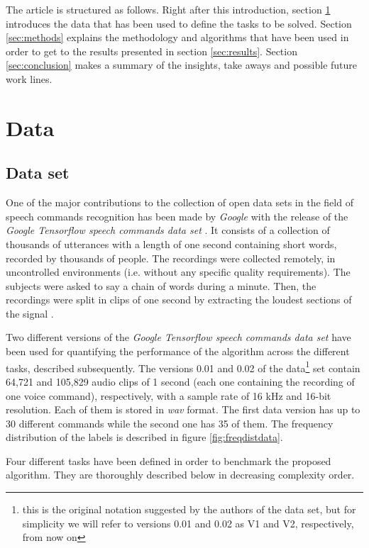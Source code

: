 \documentclass[review]{elsarticle}
\begin{document}
 The article is structured as follows. Right after this introduction, section \ref{sec:data} introduces the data that has been used to define the tasks to be solved. Section \ref{sec:methods} explains the methodology and algorithms that have been used in order to get to the results presented in section \ref{sec:results}. Section \ref{sec:conclusion} makes a summary of the insights, take aways and possible future work lines.
  
 \section{Data} \label{sec:data} 

\subsection{Data set}
One of the major contributions to the collection of open data sets in the field of speech commands recognition has been made by \textit{Google} with the release of the \textit{Google Tensorflow speech commands data set} \cite{speechcommands, Warden2018}. It consists of a collection of thousands of utterances with a length of one second containing short words, recorded by thousands of people. The recordings were collected remotely, in uncontrolled environments (i.e. without any specific quality requirements). The subjects were asked to say a chain of words during a minute. Then, the recordings were split in clips of one second by extracting the loudest sections of the signal \cite{speechcommands, Warden2018}.

Two different versions of the \textit{Google Tensorflow speech commands data set} have been used for quantifying the performance of the algorithm across the different tasks, described subsequently. The versions 0.01 and 0.02 of the data\footnote{this is the original notation suggested by the authors of the data set, but for simplicity we will refer to versions 0.01 and 0.02 as V1 and V2, respectively, from now on} set contain 64,721 and 105,829 audio clips of 1 second (each one containing the recording of one voice command), respectively, with a sample rate of 16 kHz and 16-bit resolution. Each of them is stored in \textit{wav} format. The first data version has up to 30 different commands while the second one has 35 of them. The frequency distribution of the labels is described in figure \ref{fig:freqdistdata}.

Four different tasks have been defined in order to benchmark the proposed algorithm. They are thoroughly described below in decreasing complexity order.
\end{document}

